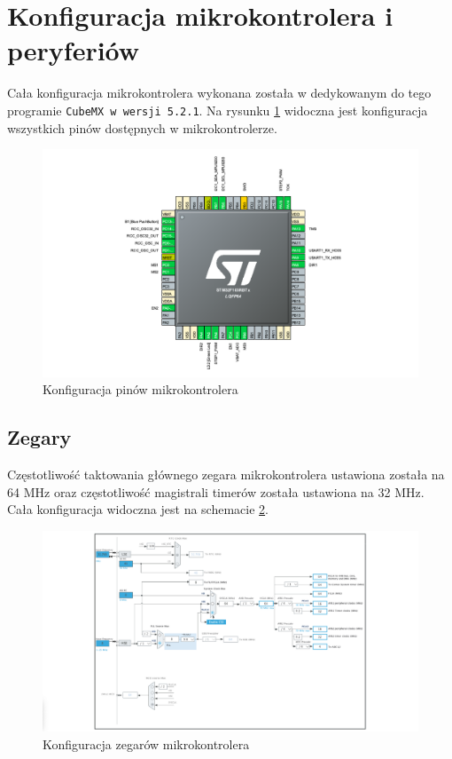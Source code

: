 \section{Konfiguracja mikrokontrolera i peryferiów}

Cała konfiguracja mikrokontrolera wykonana została w dedykowanym do tego programie \texttt{CubeMX w wersji 5.2.1}. Na rysunku \ref{Piny} widoczna jest konfiguracja wszystkich pinów dostępnych w mikrokontrolerze.

\begin{figure}[h!]
    \centering
    \includegraphics[width=1\textwidth]{Rysunki/Rozdzial05/Pinout.png}
    \caption{Konfiguracja pinów mikrokontrolera}
    \label{Piny}
\end{figure}

\subsection{Zegary}

Częstotliwość taktowania głównego zegara mikrokontrolera ustawiona została na 64 MHz oraz częstotliwość magistrali timerów została ustawiona na 32 MHz. Cała konfiguracja widoczna jest na schemacie \ref{Zegary}.

\begin{figure}[h!]
    \centering
    \includegraphics[width=1\textwidth]{Rysunki/Rozdzial05/Zegary.png}
    \caption{Konfiguracja zegarów mikrokontrolera}
    \label{Zegary}
\end{figure}

